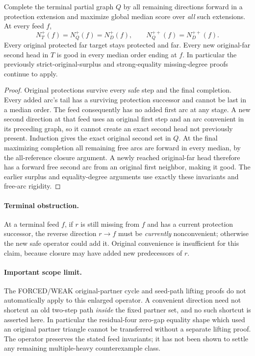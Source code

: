 \begin{corollary}
\label{cor:convenient-nonmax-tail-feed-invariants}
Complete the terminal partial graph $Q$ by all remaining directions
forward in a protection extension and maximize global median score
over \emph{all} such extensions. At every feed $f$,
\[
 N_T^+(f)=N_Q^+(f)=N_D^+(f),\qquad
 N_Q^{++}(f)=N_D^{++}(f).
\]
Every original protected far target stays protected and far. Every new
original-far second head in $T$ is good in every median order ending
at $f$. In particular the previously strict-original-surplus
and strong-equality missing-degree proofs continue to apply.
\end{corollary}
\begin{proof}
Original protections survive every safe step and the final completion.
Every added arc's tail has a surviving protection successor and cannot
be last in a median order. The feed consequently has no added first
arc at any stage. A new second direction at that feed uses an original
first step and an arc convenient in its preceding graph, so it cannot
create an exact second head not previously present. Induction gives
the exact original second set in $Q$. At the final maximizing
completion all remaining free arcs are forward in every median,
by the all-reference closure argument. A newly reached original-far
head therefore has a forward free second arc from an original first
neighbor, making it good. The earlier surplus and equality-degree
arguments use exactly these invariants and free-arc rigidity.
\end{proof}

\paragraph{Terminal obstruction.}
At a terminal feed $f$, if $r$ is still missing from $f$ and has a
current protection successor, the reverse direction $r\to f$ must
be \emph{currently} nonconvenient; otherwise the new safe operator
could add it. Original convenience is insufficient for this claim,
because closure may have added new predecessors of $r$.

\paragraph{Important scope limit.}
The FORCED/WEAK original-partner cycle and seed-path lifting proofs
do not automatically apply to this enlarged operator. A convenient
direction need not shortcut an old two-step path \emph{inside} the
fixed partner set, and no such shortcut is asserted here. In particular
the residual-four zero-gap equality shape which used an original
partner triangle cannot be transferred without a separate lifting
proof. The operator preserves the stated feed invariants; it has not
been shown to settle any remaining multiple-heavy counterexample class.

